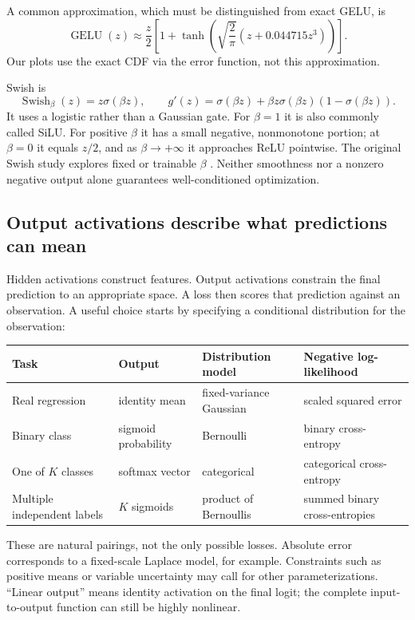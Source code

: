 A common approximation, which must be distinguished from exact GELU, is
\[
 \operatorname{GELU}(z)\approx\frac z2\left[1+\tanh\!\left(\sqrt{\frac2\pi}(z+0.044715z^3)\right)\right].
\]
Our plots use the exact CDF via the error function, not this approximation.

Swish is
\[
 \operatorname{Swish}_\beta(z)=z\sigma(\beta z),\qquad
 g'(z)=\sigma(\beta z)+\beta z\sigma(\beta z)(1-\sigma(\beta z)).
\]
It uses a logistic rather than a Gaussian gate. For $\beta=1$ it is also commonly called SiLU. For positive $\beta$ it has a small negative, nonmonotone portion; at $\beta=0$ it equals $z/2$, and as $\beta\to+\infty$ it approaches ReLU pointwise. The original Swish study explores fixed or trainable $\beta$ \citep{ramachandran2017swish}. Neither smoothness nor a nonzero negative output alone guarantees well-conditioned optimization.

\subsection{Output activations describe what predictions can mean}
Hidden activations construct features. Output activations constrain the final prediction to an appropriate space. A loss then scores that prediction against an observation. A useful choice starts by specifying a conditional distribution for the observation:
\begin{center}
\small
\begin{tabular}{p{3cm}p{3cm}p{3.5cm}p{4cm}}
\toprule
Task & Output & Distribution model & Negative log-likelihood\\
\midrule
Real regression & identity mean & fixed-variance Gaussian & scaled squared error\\
Binary class & sigmoid probability & Bernoulli & binary cross-entropy\\
One of $K$ classes & softmax vector & categorical & categorical cross-entropy\\
Multiple independent labels & $K$ sigmoids & product of Bernoullis & summed binary cross-entropies\\
\bottomrule
\end{tabular}
\end{center}
These are natural pairings, not the only possible losses. Absolute error corresponds to a fixed-scale Laplace model, for example. Constraints such as positive means or variable uncertainty may call for other parameterizations. ``Linear output'' means identity activation on the final logit; the complete input-to-output function can still be highly nonlinear.

